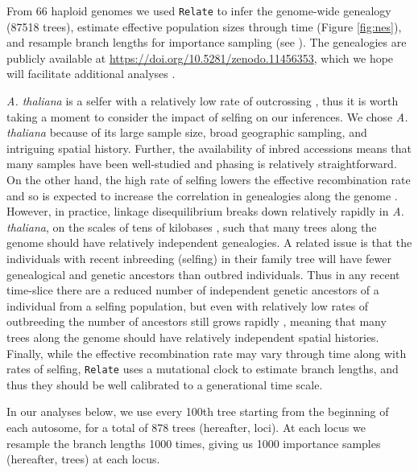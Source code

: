 \documentclass[12pt]{article}
\begin{document}
From 66 haploid genomes we used \texttt{Relate} \citep{speidel2019method} to infer the genome-wide genealogy (87518 trees), estimate effective population sizes through time (Figure \ref{fig:nes}), and resample branch lengths for importance sampling (see ). The genealogies are publicly available at \url{https://doi.org/10.5281/zenodo.11456353}, which we hope will facilitate additional analyses \citep[e.g., inferring selection;][]{stern2019approximate,stern2020disentangling}.

\textit{A. thaliana} is a selfer with a relatively low rate of outcrossing \citep{bomblies2010local,platt2010scale}, thus it is worth taking a moment to consider the impact of selfing on our inferences. We chose \textit{A. thaliana} because of its large sample size, broad geographic sampling, and intriguing spatial history. Further, the availability of inbred accessions means that many samples have been well-studied and phasing is relatively straightforward. On the other hand, the high rate of selfing lowers the effective recombination rate and so is expected to increase the correlation in genealogies along the genome \citep{nordborg2000linkage}. However, in practice, linkage disequilibrium breaks down relatively rapidly in \textit{A. thaliana}, on the scales of tens of kilobases \citep{kim2007recombination}, such that many trees along the genome should have relatively independent genealogies. A related issue is that the individuals with recent inbreeding (selfing) in their family tree will have fewer genealogical and genetic ancestors than outbred individuals. Thus in any recent time-slice there are a reduced number of independent genetic ancestors of a individual from a selfing population, but even with relatively low rates of outbreeding the number of ancestors still grows rapidly \citep{lachance2009inbreeding}, meaning that many trees along the genome should have relatively independent spatial histories. Finally, while the effective recombination rate may vary through time along with rates of selfing, \texttt{Relate} uses a mutational clock to estimate branch lengths, and thus they should be well calibrated to a generational time scale.

In our analyses below, we use every 100th tree starting from the beginning of each autosome, for a total of 878 trees (hereafter, loci). At each locus we resample the branch lengths 1000 times, giving us 1000 importance samples (hereafter, trees) at each locus.

\end{document}
